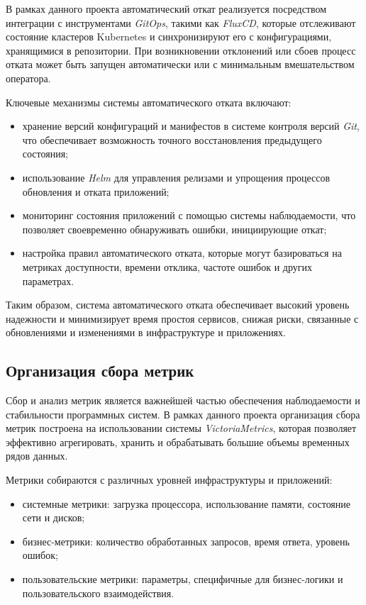 В рамках данного проекта автоматический откат реализуется посредством интеграции с инструментами \textit{GitOps}, такими как \textit{FluxCD}, которые отслеживают состояние кластеров Kubernetes и синхронизируют его с конфигурациями, хранящимися в репозитории. При возникновении отклонений или сбоев процесс отката может быть запущен автоматически или с минимальным вмешательством оператора.

Ключевые механизмы системы автоматического отката включают:

\begin{itemize}
    \item хранение версий конфигураций и манифестов в системе контроля версий \textit{Git}, что обеспечивает возможность точного восстановления предыдущего состояния;
    \item использование \textit{Helm} для управления релизами и упрощения процессов обновления и отката приложений;
    \item мониторинг состояния приложений с помощью системы наблюдаемости, что позволяет своевременно обнаруживать ошибки, инициирующие откат;
    \item настройка правил автоматического отката, которые могут базироваться на метриках доступности, времени отклика, частоте ошибок и других параметрах.
\end{itemize}

Таким образом, система автоматического отката обеспечивает высокий уровень надежности и минимизирует время простоя сервисов, снижая риски, связанные с обновлениями и изменениями в инфраструктуре и приложениях.



\subsection{Организация сбора метрик}

Сбор и анализ метрик является важнейшей частью обеспечения наблюдаемости и стабильности программных систем. В рамках данного проекта организация сбора метрик построена на использовании системы \textit{VictoriaMetrics}, которая позволяет эффективно агрегировать, хранить и обрабатывать большие объемы временных рядов данных.

Метрики собираются с различных уровней инфраструктуры и приложений:

\begin{itemize}
    \item системные метрики: загрузка процессора, использование памяти, состояние сети и дисков;
    \item бизнес-метрики: количество обработанных запросов, время ответа, уровень ошибок;
    \item пользовательские метрики: параметры, специфичные для бизнес-логики и пользовательского взаимодействия.
\end{itemize}

